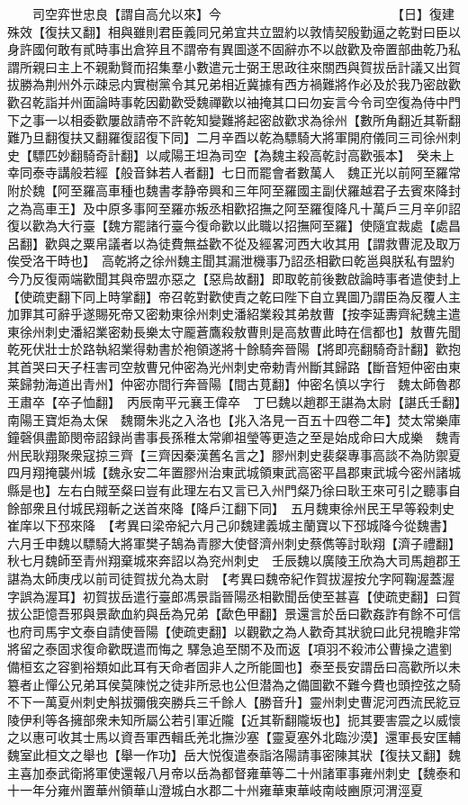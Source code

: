 　　司空弈世忠良【謂自高允以來】今　　　　　　　　　　　　　　【日】復建殊效【復扶又翻】相與雖則君臣義同兄弟宜共立盟約以敦情契殷勤逼之乾對曰臣以身許國何敢有貳時事出倉猝且不謂帝有異圖遂不固辭亦不以啟歡及帝置部曲乾乃私謂所親曰主上不親勳賢而招集羣小數遣元士弼王思政往來關西與賀拔岳計議又出賀拔勝為荆州外示疎忌内實樹黨令其兄弟相近冀據有西方禍難將作必及於我乃密啟歡歡召乾詣并州面論時事乾因勸歡受魏禪歡以䄂掩其口曰勿妄言今令司空復為侍中門下之事一以相委歡屢啟請帝不許乾知變難將起密啟歡求為徐州【數所角翻近其靳翻難乃旦翻復扶又翻羅復詔復下同】二月辛酉以乾為驃騎大將軍開府儀同三司徐州刺史【驃匹妙翻騎奇計翻】以咸陽王坦為司空【為魏主殺高乾討高歡張本】　癸未上幸同泰寺講般若經【般音鉢若人者翻】七日而罷會者數萬人　魏正光以前阿至羅常附於魏【阿至羅高車種也魏書孝静帝興和三年阿至羅國主副伏羅越君子去賓來降封之為高車王】及中原多事阿至羅亦叛丞相歡招撫之阿至羅復降凡十萬戶三月辛卯詔復以歡為大行臺【魏方罷諸行臺今復命歡以此職以招撫阿至羅】使隨宜裁處【處昌呂翻】歡與之粟帛議者以為徒費無益歡不從及經畧河西大收其用【謂救曹泥及取万俟受洛干時也】　高乾將之徐州魏主聞其漏泄機事乃詔丞相歡曰乾邕與朕私有盟約今乃反復兩端歡聞其與帝盟亦惡之【惡烏故翻】即取乾前後數啟論時事者遣使封上【使疏吏翻下同上時掌翻】帝召乾對歡使責之乾曰陛下自立異圖乃謂臣為反覆人主加罪其可辭乎遂賜死帝又密勅東徐州刺史潘紹業殺其弟敖曹【按李延夀齊紀魏主遣東徐州刺史潘紹業密勅長樂太守龎蒼鷹殺敖曹則是高敖曹此時在信都也】敖曹先聞乾死伏壯士於路執紹業得勅書於袍領遂將十餘騎奔晉陽【將即亮翻騎奇計翻】歡抱其首哭曰天子枉害司空敖曹兄仲密為光州刺史帝勅青州斷其歸路【斷音短仲密由東莱歸勃海道出青州】仲密亦間行奔晉陽【間古莧翻】仲密名慎以字行　魏太師魯郡王肅卒【卒子恤翻】　丙辰南平元襄王偉卒　丁巳魏以趙郡王諶為太尉【諶氏壬翻】南陽王寶炬為太保　魏爾朱兆之入洛也【兆入洛見一百五十四卷二年】焚太常樂庫鐘磬俱盡節閔帝詔録尚書事長孫稚太常卿祖瑩等更造之至是始成命曰大成樂　魏青州民耿翔聚衆寇掠三齊【三齊因秦漢舊名言之】膠州刺史裴粲專事高談不為防禦夏四月翔掩襲州城【魏永安二年置膠州治東武城領東武高密平昌郡東武城今密州諸城縣是也】左右白賊至粲曰豈有此理左右又言已入州門粲乃徐曰耿王來可引之聽事自餘部衆且付城民翔斬之送首來降【降戶江翻下同】　五月魏東徐州民王早等殺刺史崔庠以下邳來降　【考異曰梁帝紀六月己卯魏建義城主蘭寶以下邳城降今從魏書】　六月壬申魏以驃騎大將軍樊子鵠為青膠大使督濟州刺史蔡儁等討耿翔【濟子禮翻】秋七月魏師至青州翔棄城來奔詔以為兖州刺史　壬辰魏以廣陵王欣為大司馬趙郡王諶為太師庚戌以前司徒賀拔允為太尉　【考異曰魏帝紀作賀拔渥按允字阿鞠渥蓋渥字誤為渥耳】初賀拔岳遣行臺郎馮景詣晉陽丞相歡聞岳使至甚喜【使疏吏翻】曰賀拔公詎憶吾邪與景歃血約與岳為兄弟【歃色甲翻】景還言於岳曰歡姦詐有餘不可信也府司馬宇文泰自請使晉陽【使疏吏翻】以觀歡之為人歡奇其狀貌曰此兒視瞻非常將留之泰固求復命歡既遣而悔之驛急追至關不及而返【項羽不殺沛公曹操之遣劉備桓玄之容劉裕類如此耳有天命者固非人之所能圖也】泰至長安謂岳曰高歡所以未簒者止憚公兄弟耳侯莫陳悦之徒非所忌也公但潜為之備圖歡不難今費也頭控弦之騎不下一萬夏州刺史斛拔彌俄突勝兵三千餘人【勝音升】靈州刺史曹泥河西流民紇豆陵伊利等各擁部衆未知所屬公若引軍近隴【近其靳翻隴坂也】扼其要害震之以威懷之以惠可收其士馬以資吾軍西輯氐羌北撫沙塞【靈夏塞外北臨沙漠】還軍長安匡輔魏室此桓文之舉也【舉一作功】岳大悦復遣泰詣洛陽請事密陳其狀【復扶又翻】魏主喜加泰武衛將軍使還報八月帝以岳為都督雍華等二十州諸軍事雍州刺史【魏泰和十一年分雍州置華州領華山澄城白水郡二十州雍華東華岐南岐豳原河渭涇夏